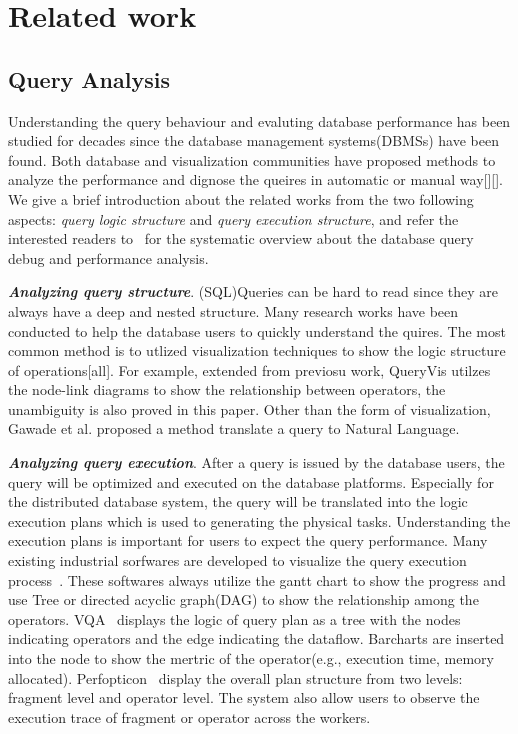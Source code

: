 \section{Related work}
\subsection{Query Analysis}
Understanding the query behaviour and evaluting database performance has been studied for decades since the database management systems(DBMSs) have been found. Both database and visualization communities have proposed methods to analyze the performance and dignose the queires in automatic or manual way[][]. We give a brief introduction about the related works from the two following aspects: \textit{query logic structure} and \textit{query execution structure}, and refer the interested readers to~\cite{gathani2020debugging} for the systematic overview about the database query debug and performance analysis.

\emph{\textbf{Analyzing query structure}}. (SQL)Queries can be hard to read since they are always have a deep and nested structure. Many research works have been conducted to help the database users to quickly understand the quires. The most common method is to utlized visualization techniques to show the logic structure of operations[all]. For example, extended from previosu work, QueryVis utilzes the node-link diagrams to show the relationship between operators, the unambiguity is also proved in this paper. Other than the form of visualization, Gawade et al. proposed a method translate a query to Natural Language.  

\emph{\textbf{Analyzing query execution}}. 
After a query is issued by the database users, the query will be optimized and executed on the database platforms. Especially for the distributed database system, the query will be translated into the logic execution plans which is used to generating the physical tasks. Understanding the execution plans is important for users to expect the query performance. Many existing industrial sorfwares are developed to visualize the query execution process~\cite{tez-ui}. These softwares always utilize the gantt chart to show the progress and use Tree or directed acyclic graph(DAG) to show the relationship among the operators. VQA~\cite{simitsis2014vqa} displays the logic of query plan as a tree with the nodes indicating operators and the edge indicating the dataflow. Barcharts are inserted into the node to show the mertric of the operator(e.g., execution time, memory allocated). Perfopticon~\cite{moritz2015perfopticon} display the overall plan structure from two levels: fragment level and operator level. The system also allow users to observe the execution trace of fragment or operator across the workers.


